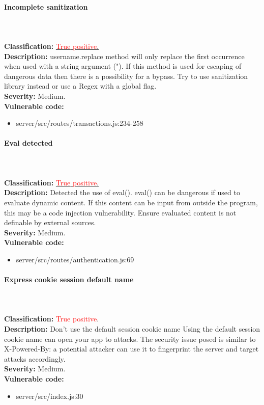 \documentclass[]{article}
\begin{document}
\paragraph{Incomplete sanitization} \mbox{} \\ \\
\textbf{Classification:} \hyperref[subsubsec:improper_limitation_of_a_pathname_to_a_restricted_directory]{\textcolor{red}{True} \textcolor{red}{positive}.} \\ 
\textbf{Description:} username.replace method will only replace the first occurrence when used with a string argument ("). 
If this method is used for escaping of dangerous data then there is a possibility for a bypass. Try to use sanitization 
library instead or use a Regex with a global flag. \\ 
\textbf{Severity:} Medium. \\ 
\textbf{Vulnerable code:} 
\begin{itemize}
    \item server/src/routes/transactions.js:234-258
\end{itemize}

\paragraph{Eval detected} \mbox{} \\ \\
\textbf{Classification:} \hyperref[subsubsec:improper_neutralization_of_directives_in_dynamically_evaluated_code]{\textcolor{red}{True} \textcolor{red}{positive}.} \\ 
\textbf{Description:} Detected the use of eval(). eval() can be dangerous if used to evaluate dynamic content. If this 
content can be input from outside the program, this may be a code injection vulnerability. Ensure evaluated content is 
not definable by external sources. \\ 
\textbf{Severity:} Medium. \\ 
\textbf{Vulnerable code:} 
\begin{itemize}
    \item server/src/routes/authentication.js:69
\end{itemize}

\paragraph{Express cookie session default name} \mbox{} \\ \\
\textbf{Classification:} \textcolor{red}{True} \textcolor{red}{positive}. \\ 
\textbf{Description:} Don't use the default session cookie name Using the default session cookie name can open your 
app to attacks. The security issue posed is similar to X-Powered-By: a potential attacker can use it to fingerprint 
the server and target attacks accordingly. \\ 
\textbf{Severity:} Medium. \\ 
\textbf{Vulnerable code:} 
\begin{itemize}
    \item server/src/index.js:30
\end{itemize}
\end{document}
